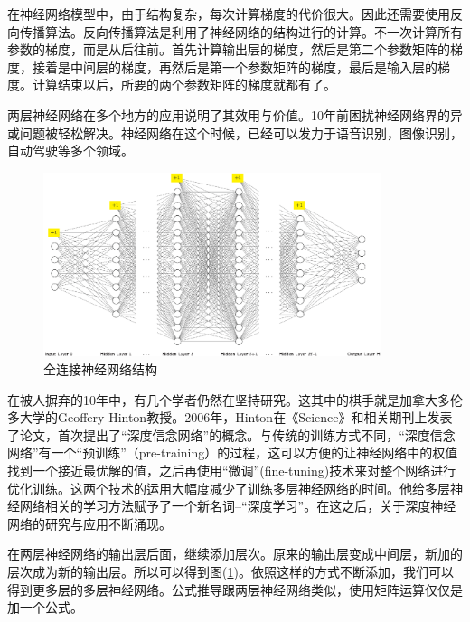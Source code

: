 \documentclass[UTF-8]{progbookcn}
\begin{document}
在神经网络模型中，由于结构复杂，每次计算梯度的代价很大。因此还需要使用反向传播算法。反向传播算法是利用了神经网络的结构进行的计算。不一次计算所有参数的梯度，而是从后往前。首先计算输出层的梯度，然后是第二个参数矩阵的梯度，接着是中间层的梯度，再然后是第一个参数矩阵的梯度，最后是输入层的梯度。计算结束以后，所要的两个参数矩阵的梯度就都有了。

两层神经网络在多个地方的应用说明了其效用与价值。10年前困扰神经网络界的异或问题被轻松解决。神经网络在这个时候，已经可以发力于语音识别，图像识别，自动驾驶等多个领域。
\begin{figure}[!ht]%
  \centering
  \includegraphics[width=0.88\textwidth]{NNF.eps}
  \caption{全连接神经网络结构}
  \label{fig:NNFrame}
\end{figure}




在被人摒弃的10年中，有几个学者仍然在坚持研究。这其中的棋手就是加拿大多伦多大学的Geoffery Hinton教授。2006年，Hinton在《Science》和相关期刊上发表了论文，首次提出了“深度信念网络”的概念\cite{DBLP:journals/neco/HintonOT06}。与传统的训练方式不同，“深度信念网络”有一个“预训练”（pre-training）的过程，这可以方便的让神经网络中的权值找到一个接近最优解的值，之后再使用“微调”(fine-tuning)技术来对整个网络进行优化训练。这两个技术的运用大幅度减少了训练多层神经网络的时间。他给多层神经网络相关的学习方法赋予了一个新名词--“深度学习”。在这之后，关于深度神经网络的研究与应用不断涌现。

在两层神经网络的输出层后面，继续添加层次。原来的输出层变成中间层，新加的层次成为新的输出层。所以可以得到图(\ref{fig:NNFrame})。依照这样的方式不断添加，我们可以得到更多层的多层神经网络。公式推导跟两层神经网络类似，使用矩阵运算仅仅是加一个公式。
\end{document}
